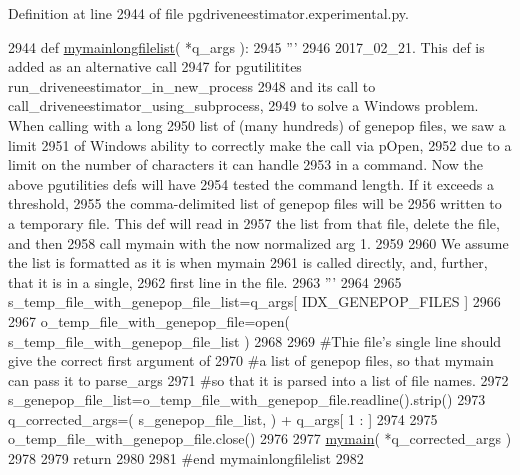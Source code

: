 Definition at line 2944 of file pgdriveneestimator.\+experimental.\+py.


\begin{DoxyCode}
2944 \textcolor{keyword}{def }\hyperlink{namespacenegui_1_1pgdriveneestimator_a4010f65f71a1bce539c5e15317632be2}{mymainlongfilelist}( *q\_args ):
2945     \textcolor{stringliteral}{'''}
2946 \textcolor{stringliteral}{    2017\_02\_21.  This def is added as an alternative call}
2947 \textcolor{stringliteral}{    for pgutilitites run\_driveneestimator\_in\_new\_process}
2948 \textcolor{stringliteral}{    and its call to call\_driveneestimator\_using\_subprocess,}
2949 \textcolor{stringliteral}{    to solve a Windows problem.  When calling with a long}
2950 \textcolor{stringliteral}{    list of (many hundreds) of genepop files, we saw a limit}
2951 \textcolor{stringliteral}{    of Windows ability to correctly make the call via pOpen, }
2952 \textcolor{stringliteral}{    due to a limit on the number of characters it can handle}
2953 \textcolor{stringliteral}{    in a command.  Now the above pgutilities defs will have}
2954 \textcolor{stringliteral}{    tested the command length.  If it exceeds a threshold,}
2955 \textcolor{stringliteral}{    the comma-delimited list of genepop files will be}
2956 \textcolor{stringliteral}{    written to a temporary file.  This def will read in}
2957 \textcolor{stringliteral}{    the list from that file, delete the file, and then}
2958 \textcolor{stringliteral}{    call mymain with the now normalized arg 1.}
2959 \textcolor{stringliteral}{}
2960 \textcolor{stringliteral}{    We assume the list is formatted as it is when mymain}
2961 \textcolor{stringliteral}{    is called directly, and, further, that it is in a single,}
2962 \textcolor{stringliteral}{    first line in the file.}
2963 \textcolor{stringliteral}{    '''}
2964 
2965     s\_temp\_file\_with\_genepop\_file\_list=q\_args[ IDX\_GENEPOP\_FILES ]
2966 
2967     o\_temp\_file\_with\_genepop\_file=open( s\_temp\_file\_with\_genepop\_file\_list )
2968 
2969     \textcolor{comment}{#Thie file's single line should give the correct first argument of}
2970     \textcolor{comment}{#a list of genepop files, so that mymain can pass it to parse\_args }
2971     \textcolor{comment}{#so that it is parsed into a list of file names.}
2972     s\_genepop\_file\_list=o\_temp\_file\_with\_genepop\_file.readline().strip()
2973     q\_corrected\_args=( s\_genepop\_file\_list, ) + q\_args[ 1 : ]
2974 
2975     o\_temp\_file\_with\_genepop\_file.close()
2976 
2977     \hyperlink{namespacenegui_1_1pgdriveneestimator_a8344146a59d84da02da349abd68723ad}{mymain}( *q\_corrected\_args )
2978 
2979     \textcolor{keywordflow}{return}
2980 
2981 \textcolor{comment}{#end mymainlongfilelist}
2982 
\end{DoxyCode}
